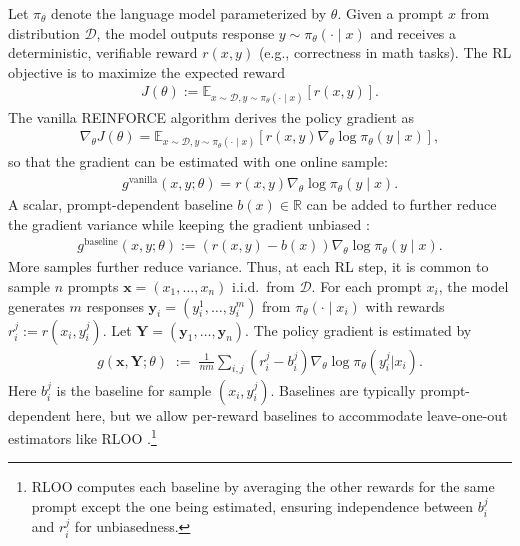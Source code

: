 \documentclass{article}
\renewcommand{\vec}[1]{\mathbf{#1}}
\theoremstyle{plain}
\theoremstyle{definition}
\theoremstyle{remark}
\newcommand{\cD}{\mathcal{D}}
\newcommand{\E}{\mathbb{E}}
\begin{document}
Let $\pi_\theta$ denote the language model parameterized by $\theta$. Given a prompt $x$ from distribution $\cD$, the model outputs response $y \sim \pi_\theta(\cdot\mid x)$ and receives a deterministic, verifiable reward $r(x,y)$ (e.g., correctness in math tasks). The RL objective is to maximize the expected reward
\begin{align*}
J(\theta):=\E_{x\sim \cD, y\sim \pi_\theta(\cdot\mid x)}[r(x,y)].
\end{align*}
The vanilla REINFORCE algorithm \citep{williams1992simple} derives the policy gradient as 
\begin{align*}
\nabla_\theta J(\theta)=\E_{x\sim \cD, y\sim \pi_\theta(\cdot\mid x)}[r(x,y)\nabla_\theta \log \pi_\theta(y\mid x)],
\end{align*}
so that the gradient can be estimated with one online sample: 
\begin{align*}
g^{\mathrm{vanilla}}(x,y;\theta)=r(x,y)\nabla_\theta \log \pi_\theta(y\mid x). 
\end{align*}
A scalar, prompt-dependent baseline $b(x) \in \mathbb R$ can be added to further reduce the gradient variance while keeping the gradient unbiased \citep{sutton1998reinforcement}:
\begin{align*}
g^{\mathrm{baseline}}(x,y;\theta):=(r(x,y)-b(x))\nabla_\theta \log \pi_\theta(y\mid x).
\end{align*}
More samples further reduce variance. Thus, at each RL step, it is common to sample $n$ prompts $\textstyle\vec x = (x_1,\ldots,x_n)$ i.i.d.\ from $\cD$. For each prompt $x_i$, the model generates $m$ responses $\textstyle\vec y_i = (y_i^1,\ldots,y_i^m)$ from $\pi_\theta(\cdot\mid x_i)$ with rewards $\textstyle r_i^j := r(x_i,y_i^j)$. Let $\textstyle\vec Y = (\vec y_1,\ldots,\vec y_n)$. The policy gradient is estimated by
\begin{align}
\boxed{g(\vec x, \vec Y;\theta)\;:=\;\tfrac{1}{nm}\textstyle\sum_{i,j} (r_i^j-b_i^j)\nabla_\theta \log \pi_\theta(y_i^j|x_i).}
    \label{eq:grad}
\end{align}
Here $b_i^j$ is the baseline for sample $(x_i,y_i^j)$. Baselines are typically prompt-dependent here, but we allow per-reward baselines to accommodate leave-one-out estimators like RLOO \citep{ahmadian2024back}.\footnote{RLOO computes each baseline by averaging the other rewards for the same prompt except the one being estimated, ensuring independence between $b_i^j$ and $r_i^j$ for unbiasedness.} 
  
\end{document}
